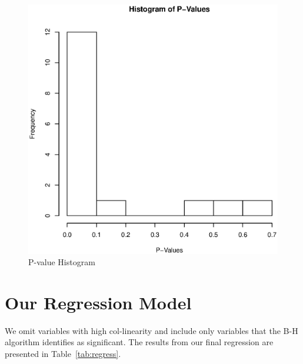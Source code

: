 \documentclass[11pt, fleqn]{article}
\begin{document}
\begin{figure}[!htb]
  \centering
  \includegraphics[scale=.5]{pvalue_hist.eps}
  \caption{P-value Histogram}
  \label{fig:pvalue}
\end{figure}

\section{Our Regression Model}

We omit variables with high col-linearity and include only variables that the B-H algorithm identifies as significant. The results from our final regression are presented in Table~\vref{tab:regress}.
\end{document}
